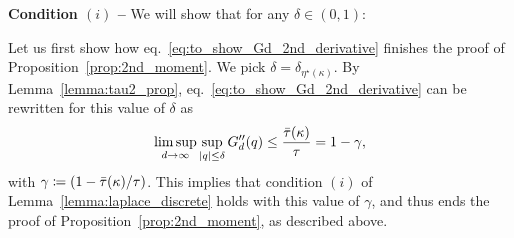 \myskip
\textbf{Condition $(i)$ --}
We will show that for any $\delta \in (0,1)$:

\myskip
Let us first show how eq.~\eqref{eq:to_show_Gd_2nd_derivative} finishes the proof of Proposition~\ref{prop:2nd_moment}. 
We pick $\delta = \delta_{\eta^\star(\kappa)}$. 
By Lemma~\ref{lemma:tau2_prop}, eq.~\eqref{eq:to_show_Gd_2nd_derivative} can be rewritten for this value of $\delta$ 
as 
\begin{align*}
    \limsup_{d \to \infty}\sup_{|q| \leq \delta} G_d''(q) \leq 
    \frac{{\bar{\tau}}(\kappa)}{\tau} = 1 - \gamma,
\end{align*}
with $\gamma \coloneqq (1 - {\bar{\tau}}(\kappa)/\tau)$.
This implies that condition $(i)$ of Lemma~\ref{lemma:laplace_discrete} holds with this value of $\gamma$, 
and thus ends the proof of Proposition~\ref{prop:2nd_moment}, as described above.

